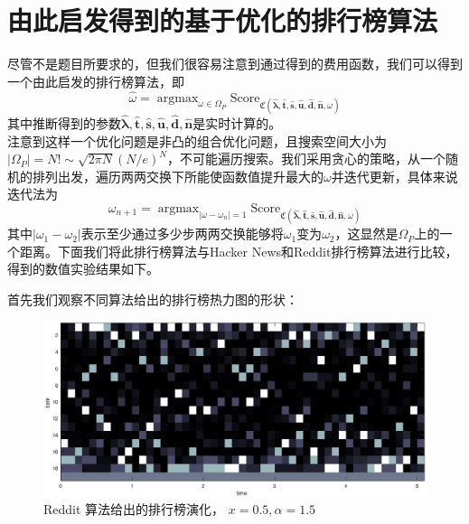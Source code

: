 \documentclass[UTF8]{ctexart}
\theoremstyle{plain}
\theoremstyle{definition}
\theoremstyle{remark}
\DeclareMathOperator*{\argmax}{argmax}
\begin{document}
	\section{由此启发得到的基于优化的排行榜算法}
	尽管不是题目所要求的，但我们很容易注意到通过得到的费用函数，我们可以得到一个由此启发的排行榜算法，即
	\begin{equation}
	\hat{\omega} = \argmax_{\omega \in \Omega_P} \mathrm{Score}_{\mathfrak{C}\left(\bm{\hat{\lambda}}, \bm{\hat{t}}, \bm{\hat{s}}, \bm{\hat{u}}, \bm{\hat{d}}, \bm{\hat{n}},\omega\right)}
	\end{equation}
	其中推断得到的参数$\bm{\hat{\lambda}}, \bm{\hat{t}}, \bm{\hat{s}}, \bm{\hat{u}}, \bm{\hat{d}}, \bm{\hat{n}}$是实时计算的。 \\
	
	注意到这样一个优化问题是非凸的组合优化问题，且搜索空间大小为$|\Omega_P| = N! \sim \sqrt{2\pi N} \left(N/e\right)^N$，不可能遍历搜索。我们采用贪心的策略，从一个随机的排列出发，遍历两两交换下所能使函数值提升最大的$\omega$并迭代更新，具体来说迭代法为
	$$
	\omega_{n+1} =  \argmax_{|\omega - \omega_n| = 1} \mathrm{Score}_{\mathfrak{C}\left(\bm{\hat{\lambda}}, \bm{\hat{t}}, \bm{\hat{s}}, \bm{\hat{u}}, \bm{\hat{d}}, \bm{\hat{n}},\omega\right)}
	$$
	其中$|\omega_1 -\omega_2|$表示至少通过多少步两两交换能够将$\omega_1$变为$\omega_2$，这显然是$\Omega_P$上的一个距离。下面我们将此排行榜算法与Hacker News和Reddit排行榜算法进行比较，得到的数值实验结果如下。
	
	首先我们观察不同算法给出的排行榜热力图的形状：
	\begin{figure}[h!]
		\centering
		\includegraphics[width = \linewidth]{../model/douhu/pic/reddit-heatmap.eps}
		\caption{Reddit 算法给出的排行榜演化， $x=0.5, \alpha=1.5$}\label{fig:reddit-heatmap}
	\end{figure}
\end{document}
